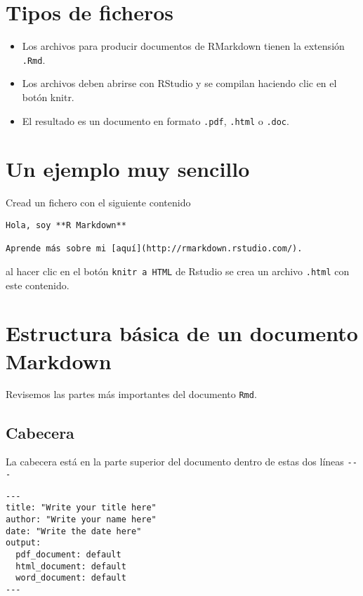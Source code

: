 \documentclass[
]{book}
\providecommand{\tightlist}{%
  \setlength{\itemsep}{0pt}\setlength{\parskip}{0pt}}
\begin{document}
\hypertarget{tipos-de-ficheros}{%
\section{Tipos de ficheros}\label{tipos-de-ficheros}}

\begin{itemize}
\tightlist
\item
  Los archivos para producir documentos de RMarkdown tienen la extensión \texttt{.Rmd}.
\item
  Los archivos deben abrirse con RStudio y se compilan haciendo clic en el botón knitr.
\item
  El resultado es un documento en formato \texttt{.pdf}, \texttt{.html} o \texttt{.doc}.
\end{itemize}

\hypertarget{un-ejemplo-muy-sencillo}{%
\section{Un ejemplo muy sencillo}\label{un-ejemplo-muy-sencillo}}

Cread un fichero con el siguiente contenido

\begin{verbatim}
Hola, soy **R Markdown**

Aprende más sobre mi [aquí](http://rmarkdown.rstudio.com/).
\end{verbatim}

al hacer clic en el botón \texttt{knitr\ a\ HTML} de Rstudio se crea un archivo \texttt{.html} con este contenido.

\hypertarget{estructura-buxe1sica-de-un-documento-markdown}{%
\section{Estructura básica de un documento Markdown}\label{estructura-buxe1sica-de-un-documento-markdown}}

Revisemos las partes más importantes del documento \texttt{Rmd}.

\hypertarget{cabecera}{%
\subsection{Cabecera}\label{cabecera}}

La cabecera está en la parte superior del documento dentro de estas dos líneas \texttt{-\/-\/-}

\begin{verbatim}
---
title: "Write your title here"
author: "Write your name here"
date: "Write the date here"
output:
  pdf_document: default
  html_document: default
  word_document: default
---
\end{verbatim}
\end{document}
